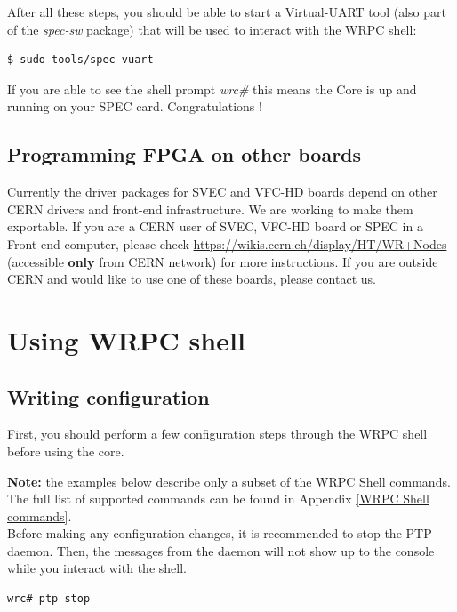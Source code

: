\documentclass[a4paper, 12pt]{article}
\renewcommand{\_}{\underscore\allowbreak}
\begin{document}
After all these steps, you should be able to start a Virtual-UART tool (also
part of the \textit{spec-sw} package) that will be used to interact with the
WRPC shell:
\begin{lstlisting}
$ sudo tools/spec-vuart
\end{lstlisting}

If you are able to see the shell prompt \textit{wrc\#} this means the Core
is up and running on your SPEC card. Congratulations !

\subsection{Programming FPGA on other boards}

Currently the driver packages for SVEC and VFC-HD boards depend on other CERN
drivers and front-end infrastructure. We are working to make them exportable. If
you are a CERN user of SVEC, VFC-HD board or SPEC in a Front-end computer,
please check
\url{https://wikis.cern.ch/display/HT/WR+Nodes} (accessible \textbf{only} from
CERN network) for more instructions. If you are outside CERN and would like to
use one of these boards, please contact us.

\newpage
\section{Using WRPC shell}

\subsection{Writing configuration}
\label{Writing configuration}

First, you should perform a few configuration steps through the WRPC shell
before using the core.

\noindent\textbf{Note:} the examples below describe only a subset of the WRPC
Shell commands. The full list of supported commands can be found in Appendix
\ref{WRPC Shell commands}.\\

Before making any configuration changes, it is recommended to stop the
PTP daemon.  Then, the messages from the daemon will not show up to the
console while you interact with the shell.

\begin{lstlisting}
wrc# ptp stop
\end{lstlisting}
\end{document}
